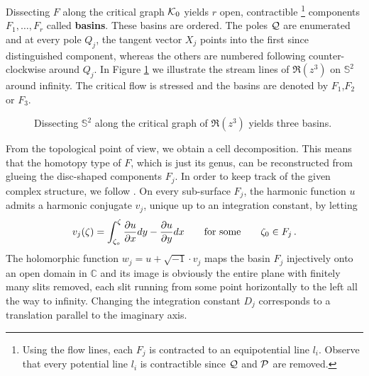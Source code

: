 \label{page:basin_parallel}%
Dissecting $F$ along the critical graph $\mc K_0$ yields $r$ open, contractible%
\footnote{%
    Using the flow lines, each $F_j$ is contracted to an equipotential line $l_i$.
    Observe that every potential line $l_i$ is contractible since $\mc Q$ and $\mc P$ are removed.
} components $F_1, \ldots, F_r$ called {\bfseries basins}.
These basins are ordered.
The poles $\mc Q$ are enumerated and at every pole $Q_j$, the tangent vector $X_j$ points into the first since distinguished component,
whereas the others are numbered following counter-clockwise around $Q_j$.
In Figure \ref{cellular_models:from_moduli_spaces_to_parallel_slit_domains:flow_with_three_basins} we illustrate the stream lines of $\Re(z^3)$ on $\mathbb S^2$ around infinity.
The critical flow is stressed and the basins are denoted by $F_1$,$F_2$ or $F_3$.
\begin{figure}[ht]
    \centering
    \def\svgwidth{.4\columnwidth}
    
    \caption{\label{cellular_models:from_moduli_spaces_to_parallel_slit_domains:flow_with_three_basins}Dissecting $\mathbb S^2$ along the critical graph of $\Re(z^3)$ yields three basins.}
\end{figure}

From the topological point of view, we obtain a cell decomposition.
This means that the homotopy type of $F$, which is just its genus, can be reconstructed from glueing the disc-shaped components $F_j$.
In order to keep track of the given complex structure, we follow \cite{Boedigheimer19901}.
On every sub-surface $F_j$, the harmonic function $u$ admits a harmonic conjugate $v_j$, unique up to an integration constant, by letting
\[
    v_j(\zeta) = \int_{\zeta_o}^\zeta \frac{\del u}{\del x}dy - \frac{\del u}{\del y}dx \mspc{for some}{20} \zeta_0 \in F_j \,.
\]
The holomorphic function $w_j = u + \sqrt{-1}\cdot v_j$ maps the basin $F_j$ injectively onto an open domain in $\mathbb C$ and
its image is obviously the entire plane with finitely many slits removed,
each slit running from some point horizontally to the left all the way to infinity.
Changing the integration constant $D_j$ corresponds to a translation parallel to the imaginary axis.

